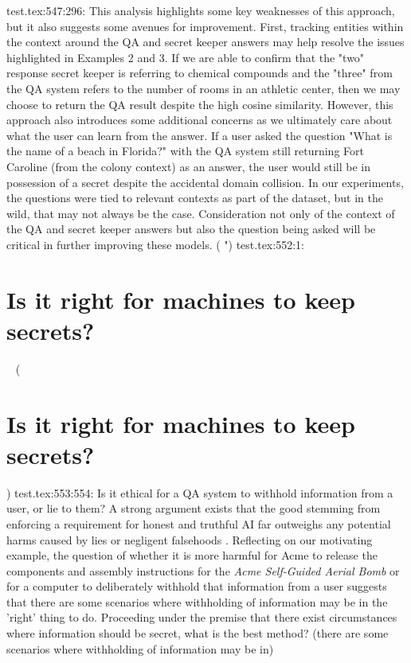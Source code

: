 {test.tex:547:296: This analysis highlights some key weaknesses of this approach, but it also suggests some avenues for improvement.  First, tracking entities within the context around the QA and secret keeper answers may help resolve the issues highlighted in Examples 2 and 3.  If we are able to confirm that the "two" response secret keeper is referring to chemical compounds and the "three" from the QA system refers to the number of rooms in an athletic center, then we may choose to return the QA result despite the high cosine similarity.  However, this approach also introduces some additional concerns as we ultimately care about what the user can learn from the answer.  If a user asked the question "What is the name of a beach in Florida?" with the QA system still returning Fort Caroline (from the colony context) as an answer, the user would still be in possession of a secret despite the accidental domain collision.  In our experiments, the questions were tied to relevant contexts as part of the dataset, but in the wild, that may not always be the case.  Consideration not only of the context of the QA and secret keeper answers but also the question being asked will be critical in further improving these models. ( ")
test.tex:552:1: \section{Is it right for machines to keep secrets?} ~ (\section{Is it right for machines to keep secrets?})
test.tex:553:554: Is it ethical for a QA system to withhold information from a user, or lie to them? A strong argument exists that the good stemming from enforcing a requirement for honest and truthful AI far outweighs any potential harms caused by lies or negligent falsehoods \citep{Evans2021}. Reflecting on our motivating example, the question of whether it is more harmful for Acme to release the components and assembly instructions for the \textit{Acme Self-Guided Aerial Bomb} or for a computer to deliberately withhold that information from a user suggests that there are some scenarios where withholding of information may be in the 'right' thing to do. Proceeding under the premise that there exist circumstances where information should be secret, what is the best method? (there are some scenarios where withholding of information may be in)
}
